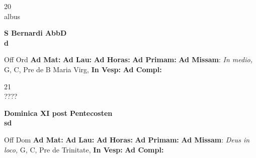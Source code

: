 \documentclass[10pt, openany]{book}
\begin{document}
    \begin{center}
        \begin{minipage}{3.5in}
            \vspace{2em}
            \begin{minipage}{0.5in}
                {\Huge 20} \\
                {\normalsize albus}
            \end{minipage}
            \begin{minipage}{3.0in}
                \textbf{ \large S Bernardi AbbD \\
                \textnormal{\normalsize d}}

            \end{minipage}
            \begin{justify}Off Ord
                \textbf{Ad Mat: }
                \textbf{Ad Lau: }
                \textbf{Ad Horas: }
                \textbf{Ad Primam: }\textbf{Ad Missam}: \textit{In medio,} G, C, Pre de B Maria Virg, 
                \textbf{In Vesp: }
                \textbf{Ad Compl: }
            \end{justify}
        \end{minipage}
    \end{center}

    \begin{center}
        \begin{minipage}{3.5in}
            \vspace{2em}
            \begin{minipage}{0.5in}
                {\Huge 21} \\
                {\normalsize ????}
            \end{minipage}
            \begin{minipage}{3.0in}
                \textbf{ \large Dominica XI post Pentecosten \\
                \textnormal{\normalsize sd}}

            \end{minipage}
            \begin{justify}Off Dom
                \textbf{Ad Mat: }
                \textbf{Ad Lau: }
                \textbf{Ad Horas: }
                \textbf{Ad Primam: }\textbf{Ad Missam}: \textit{Deus in loco,} G, C, Pre de Trinitate, 
                \textbf{In Vesp: }
                \textbf{Ad Compl: }
            \end{justify}
        \end{minipage}
    \end{center}
\end{document}

